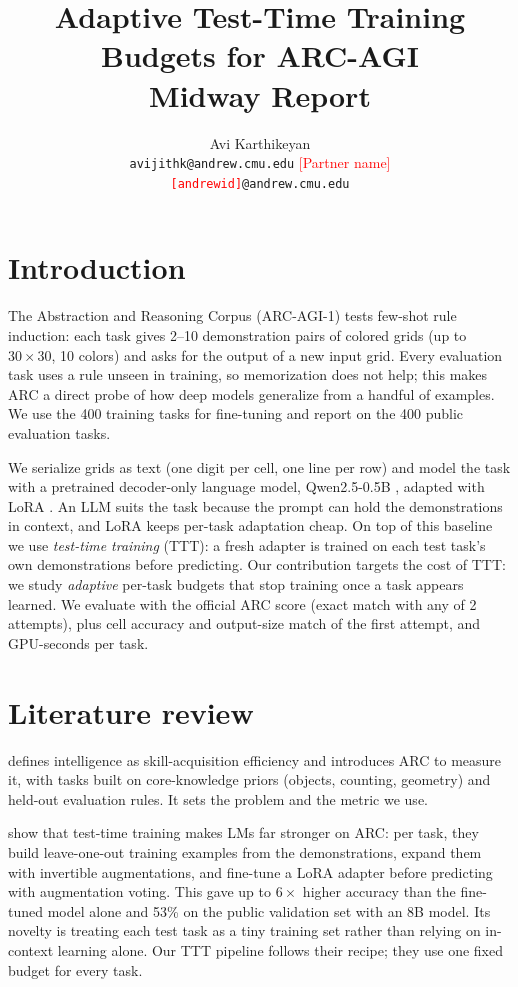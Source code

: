 \documentclass{article}
\title{Adaptive Test-Time Training Budgets for ARC-AGI\\[2pt]\large Midway Report}
\author{%
  Avi Karthikeyan \\ \texttt{avijithk@andrew.cmu.edu} \And
  \textcolor{red}{[Partner name]} \\ \texttt{\textcolor{red}{[andrewid]}@andrew.cmu.edu}
}
\begin{document}
\maketitle

\section{Introduction}

The Abstraction and Reasoning Corpus (ARC-AGI-1) \cite{chollet2019measure} tests few-shot rule induction: each task gives 2--10 demonstration pairs of colored grids (up to $30\times30$, 10 colors) and asks for the output of a new input grid. Every evaluation task uses a rule unseen in training, so memorization does not help; this makes ARC a direct probe of how deep models generalize from a handful of examples. We use the 400 training tasks for fine-tuning and report on the 400 public evaluation tasks.

We serialize grids as text (one digit per cell, one line per row) and model the task with a pretrained decoder-only language model, Qwen2.5-0.5B \cite{qwen2024qwen25}, adapted with LoRA \cite{hu2021lora}. An LLM suits the task because the prompt can hold the demonstrations in context, and LoRA keeps per-task adaptation cheap. On top of this baseline we use \emph{test-time training} (TTT): a fresh adapter is trained on each test task's own demonstrations before predicting. Our contribution targets the cost of TTT: we study \emph{adaptive} per-task budgets that stop training once a task appears learned. We evaluate with the official ARC score (exact match with any of 2 attempts), plus cell accuracy and output-size match of the first attempt, and GPU-seconds per task.

\section{Literature review}

\textbf{\textcite{chollet2019measure}} defines intelligence as skill-acquisition efficiency and introduces ARC to measure it, with tasks built on core-knowledge priors (objects, counting, geometry) and held-out evaluation rules. It sets the problem and the metric we use.

\textbf{\textcite{akyurek2024surprising}} show that test-time training makes LMs far stronger on ARC: per task, they build leave-one-out training examples from the demonstrations, expand them with invertible augmentations, and fine-tune a LoRA adapter before predicting with augmentation voting. This gave up to $6\times$ higher accuracy than the fine-tuned model alone and 53\% on the public validation set with an 8B model. Its novelty is treating each test task as a tiny training set rather than relying on in-context learning alone. Our TTT pipeline follows their recipe; they use one fixed budget for every task.
\end{document}
